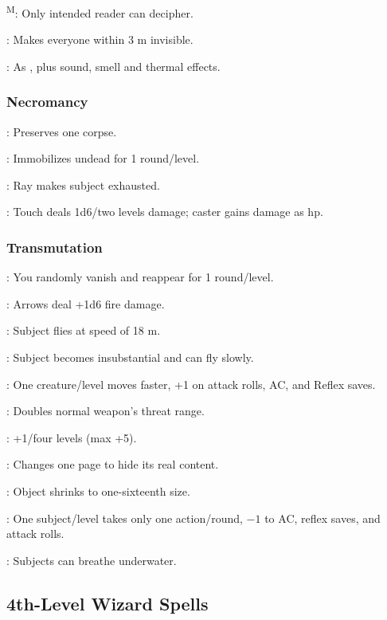 	\textsuperscript{M}: Only intended reader can decipher.

	: Makes everyone within 3 m invisible.

	: As , plus sound, smell and thermal effects.

\subsubsection{Necromancy}
	: Preserves one corpse.

	: Immobilizes undead for 1 round/level.

	: Ray makes subject exhausted.

	: Touch deals 1d6/two levels damage; caster gains damage as hp.

\subsubsection{Transmutation}
	: You randomly vanish and reappear for 1 round/level.

	: Arrows deal +1d6 fire damage.

	: Subject flies at speed of 18 m.

	: Subject becomes insubstantial and can fly slowly.

	: One creature/level moves faster, +1 on attack rolls, AC, and Reflex saves.

	: Doubles normal weapon's threat range.

	: +1/four levels (max +5).

	: Changes one page to hide its real content.

	: Object shrinks to one-sixteenth size.

	: One subject/level takes only one action/round, $-1$ to AC, reflex saves, and attack rolls.

	: Subjects can breathe underwater.



\subsection{4th-Level Wizard Spells}

